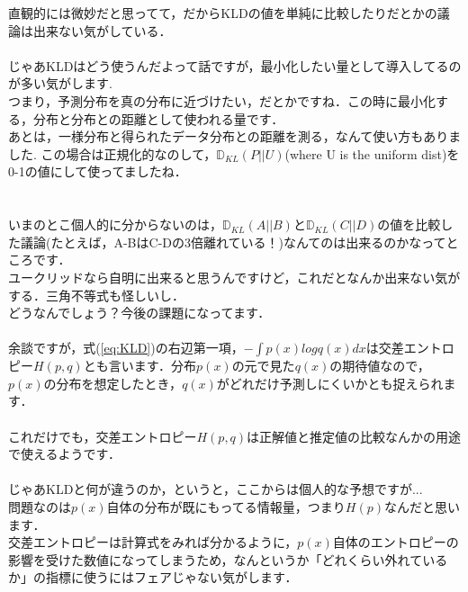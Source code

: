 \documentclass[11pt,a4paper,uplatex]{ujreport}
\begin{document}
直観的には微妙だと思ってて，だからKLDの値を単純に比較したりだとかの議論は出来ない気がしている．\\
\\

じゃあKLDはどう使うんだよって話ですが，最小化したい量として導入してるのが多い気がします.\\

つまり，予測分布を真の分布に近づけたい，だとかですね．この時に最小化する，分布と分布との距離として使われる量です．\\

あとは，一様分布と得られたデータ分布との距離を測る，なんて使い方もありました\cite{tort}. この場合は正規化的なのして，$\mathbb{D}_{KL}(P||U)$(where U is the uniform dist)を0-1の値にして使ってましたね．\\
\\
\\

いまのとこ個人的に分からないのは，$\mathbb{D}_{KL}(A||B)$と$\mathbb{D}_{KL}(C||D)$の値を比較した議論(たとえば，A-BはC-Dの3倍離れている！)なんてのは出来るのかなってところです．\\

ユークリッドなら自明に出来ると思うんですけど，これだとなんか出来ない気がする．三角不等式も怪しいし．\\
どうなんでしょう？今後の課題になってます．\\
\\

余談ですが，式(\ref{eq:KLD})の右辺第一項，$- \int p(x) log q(x)dx$は交差エントロピー$H(p,q)$とも言います．分布$p(x)$の元で見た$q(x)$の期待値なので，$p(x)$の分布を想定したとき，$q(x)$がどれだけ予測しにくいかとも捉えられます．\\
\\

これだけでも，交差エントロピー$H(p,q)$は正解値と推定値の比較なんかの用途で使えるようです．\\
\\

じゃあKLDと何が違うのか，というと，ここからは個人的な予想ですが...\\

問題なのは$p(x)$自体の分布が既にもってる情報量，つまり$H(p)$なんだと思います．\\

交差エントロピーは計算式をみれば分かるように，$p(x)$自体のエントロピーの影響を受けた数値になってしまうため，なんというか「どれくらい外れているか」の指標に使うにはフェアじゃない気がします．\\
\\
\end{document}
